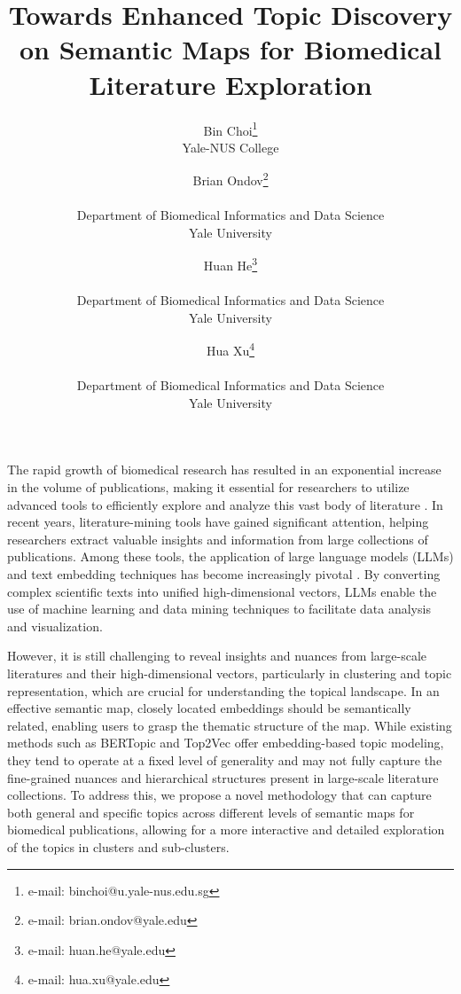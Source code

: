 \documentclass{vgtc}                          %
\title{Towards Enhanced Topic Discovery on Semantic Maps for Biomedical Literature Exploration}
\author{Bin Choi\thanks{e-mail: binchoi@u.yale-nus.edu.sg}\\ %
        \scriptsize Yale-NUS College %
\and Brian Ondov\thanks{e-mail: brian.ondov@yale.edu}\\ %
     \parbox{1.5in}{\scriptsize \centering Department of Biomedical Informatics and Data Science \\ Yale University} %
\and Huan He\thanks{e-mail: huan.he@yale.edu}\\ %
     \parbox{1.5in}{\scriptsize \centering Department of Biomedical Informatics and Data Science \\ Yale University} %
\and Hua Xu\thanks{e-mail: hua.xu@yale.edu}\\ %
     \parbox{1.5in}{\scriptsize \centering Department of Biomedical Informatics and Data Science \\ Yale University} %
}
\begin{document}


\maketitle

The rapid growth of biomedical research has resulted in an exponential increase in the volume of publications, making it essential for researchers to utilize advanced tools to efficiently explore and analyze this vast body of literature \cite{Gonzalez-Marquez2024}. In recent years, literature-mining tools have gained significant attention, helping researchers extract valuable insights and information from large collections of publications. Among these tools, the application of large language models (LLMs) and text embedding techniques has become increasingly pivotal \cite{Simon2024}. By converting complex scientific texts into unified high-dimensional vectors, LLMs enable the use of machine learning and data mining techniques to facilitate data analysis and visualization.

However, it is still challenging to reveal insights and nuances from large-scale literatures and their high-dimensional vectors, particularly in clustering and topic representation, which are crucial for understanding the topical landscape. In an effective semantic map, closely located embeddings should be semantically related, enabling users to grasp the thematic structure of the map. While existing methods such as BERTopic \cite{Grootendorst2022} and Top2Vec \cite{Angelov2020} offer embedding-based topic modeling, they tend to operate at a fixed level of generality and may not fully capture the fine-grained nuances and hierarchical structures present in large-scale literature collections. To address this, we propose a novel methodology that can capture both general and specific topics across different levels of semantic maps for biomedical publications, allowing for a more interactive and detailed exploration of the topics in clusters and sub-clusters.
\end{document}
